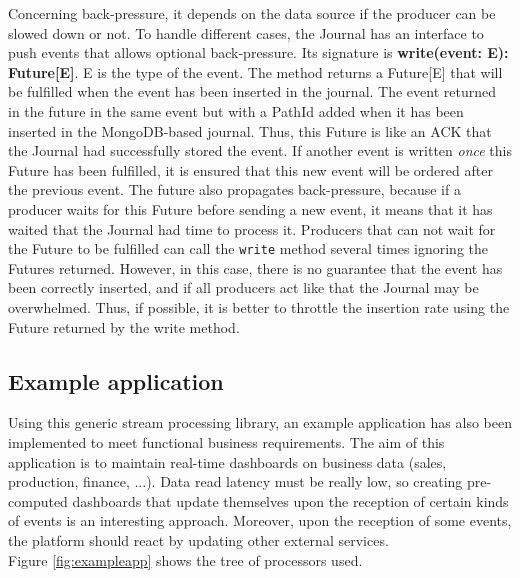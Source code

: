 Concerning back-pressure, it depends on the data source if the producer can be slowed down or not. To handle different cases, the Journal has an interface to push events that allows optional back-pressure. Its signature is \textbf{write(event: E): Future[E]}. E is the type of the event. The method returns a Future[E] that will be fulfilled when the event has been inserted in the journal. The event returned in the future in the same event but with a PathId added when it has been inserted in the MongoDB-based journal.
Thus, this Future is like an ACK that the Journal had successfully stored the event. If another event is written \textit{once} this Future has been fulfilled, it is ensured
that this new event will be ordered after the previous event. The future also propagates back-pressure, because if a producer waits for this Future before sending a new event, it means that it has waited that the Journal had time to process it. Producers that can not wait for the Future to be fulfilled can call the \verb|write| method several times
ignoring the Futures returned. However, in this case, there is no guarantee that the event has been correctly inserted, and if all producers act like that the Journal may be overwhelmed. Thus, if possible, it is better to throttle the insertion rate using the Future returned by the write method.

\subsection{Example application}

Using this generic stream processing library, an example application has also been implemented to meet functional business requirements. The aim of this application is to
maintain real-time dashboards on business data (sales, production, finance, ...). Data read latency must be really low, so creating pre-computed dashboards that
update themselves upon the reception of certain kinds of events is an interesting approach. Moreover, upon the reception of some events, the platform should react by updating other external services.
\\

Figure \ref{fig:exampleapp} shows the tree of processors used. 

